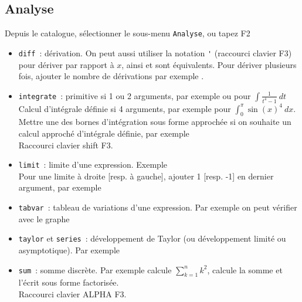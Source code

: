 \documentclass{article}
\begin{document}
\begin{giacjshere}
\subsection{Analyse}
Depuis le catalogue, s\'electionner le sous-menu \verb|Analyse|, ou
tapez F2
\begin{itemize}
\item \verb|diff|~: d\'erivation. On peut aussi utiliser la notation
\verb|'| (raccourci clavier F3) pour d\'eriver par rapport \`a $x$, ainsi
 et  sont \'equivalents.
Pour d\'eriver plusieurs fois, ajouter le nombre de d\'erivations
par exemple .
\item \verb|integrate|~: primitive si 1 ou 2 arguments,
par exemple 
 ou 
pour $\int \frac{1}{t^4-1} \ dt $\\
Calcul d'int\'egrale d\'efinie si 4 arguments, par
exemple 
pour $\int_0^\pi \sin(x)^4 \ dx$. Mettre une des bornes
d'int\'egration sous forme approch\'ee si on souhaite un calcul
approch\'e d'int\'egrale d\'efinie, par exemple
\\
Raccourci clavier shift F3.
\item \verb|limit|~: limite d'une expression.
Exemple \\
Pour une limite \`a droite [resp. \`a gauche], ajouter 1 [resp. -1]
en dernier argument, par exemple
\item \verb|tabvar|~: tableau de variations d'une expression.
Par exemple 
on peut v\'erifier avec le graphe 
\item \verb|taylor| et \verb|series|~: d\'eveloppement de Taylor
(ou d\'eveloppement limit\'e ou asymptotique). Par exemple
\item \verb|sum|~: somme discr\`ete. Par exemple
 calcule $\sum_{k=1}^n k^2$,
 calcule la somme et l'\'ecrit sous
forme factoris\'ee.\\
Raccourci clavier ALPHA F3.
\end{itemize}


\end{giacjshere}
\end{document}
